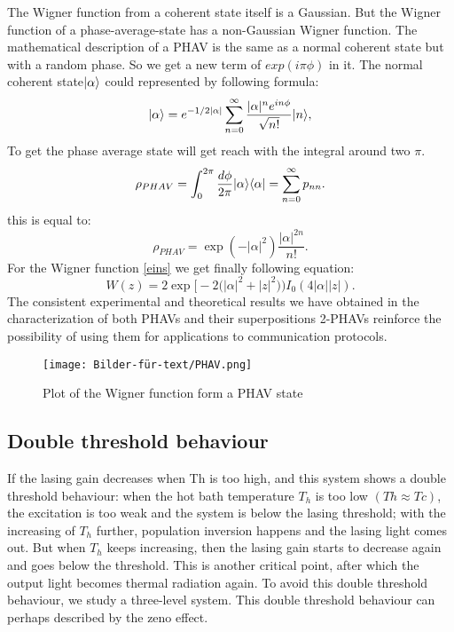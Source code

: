 \documentclass[12pt,a4paper]{article}
\DeclarePairedDelimiter\bra{\langle}{\rvert}
\DeclarePairedDelimiter\ket{\lvert}{\rangle}
\begin{document}
The Wigner function from a coherent state itself is a Gaussian. But the Wigner function of a phase-average-state has a non-Gaussian Wigner function. 
The mathematical description of a  PHAV is the same as a normal coherent state but with a random phase. So we get a new term of $exp(i\pi\phi)$ in it. 
The normal coherent state$\ket{\alpha}$ could represented by following formula: \cite{Allevi2013}
\begin{equation}
\ket{\alpha}=e^{-1/2|\alpha|}\sum_{n=0}^{\infty}\frac{|\alpha|^n e^{in\phi}}{\sqrt{n!}} \ket{n},
\end{equation}
To get the phase average state will get reach with the integral around two $\pi$.
\begin{equation}
\rho_{PHAV}=\int_0 ^{2\pi}\frac{d\phi}{2\pi}\ket{\alpha}\bra{\alpha}=\sum_{n=0}^{\infty}p_{nn}.
\end{equation}
this is equal to:
\begin{equation}
\rho_{PHAV}= \exp(-|\alpha|^2)\frac{|\alpha|^{2n}}{n!}.
\end{equation}
For the Wigner function \ref{eins} we get finally following equation:
\begin{equation}
W(z)=2  \exp\bigl[-2\bigl(|\alpha|^2+|z|^2\bigr)\bigr) I_0 (4|\alpha| |z|).
\end{equation}
The consistent experimental and theoretical results we have obtained in the characterization of both PHAVs and their superpositions 2-PHAVs reinforce the
possibility of using them for applications to communication protocols. \cite{Allevi2013}
\begin{figure}[h!]
\centering
\texttt{[image: Bilder-für-text/PHAV.png]}
\caption{Plot of the Wigner function form a PHAV state}
\end{figure}

\subsection{Double threshold behaviour}
If the lasing gain decreases when Th is too high, and this system shows a double threshold behaviour: when the hot bath temperature $T_h$ is
too low $(Th \approx Tc)$, the excitation is too weak and the system
is below the lasing threshold; with the increasing of $T_h$ further, population inversion happens and the lasing light comes out. But when $T_h$ keeps increasing, then the lasing gain starts to decrease again and goes below the threshold. This is another critical point, after which the output light becomes thermal radiation again.
To avoid this double threshold behaviour, we study a three-level system.
This double threshold behaviour can perhaps described by the zeno effect.
\end{document}
